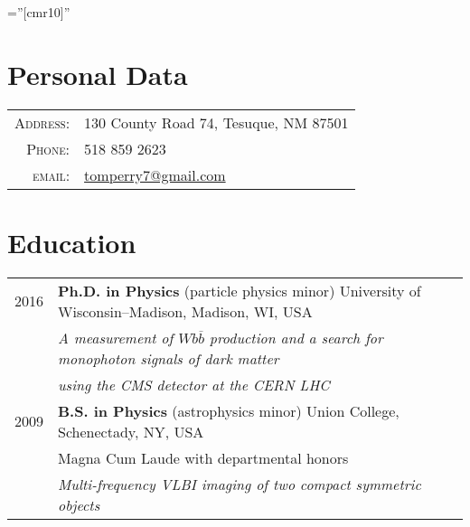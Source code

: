 \documentclass[10pt]{article} %
\begin{document}
\pagestyle{empty} %

\font\fb=''[cmr10]'' %


\par{\bigskip\par} %

\section{Personal Data}

\begin{tabular}{rl}
\textsc{Address:} & 130 County Road 74, Tesuque, NM 87501 \\
\textsc{Phone:} & 518 859 2623 \\
\textsc{email:} & \href{mailto:tomperry7@gmail.com}{tomperry7@gmail.com} \\
\end{tabular}


\section{Education}

\begin{tabular}{rl}	
2016 & {\bf Ph.D. in Physics} (particle physics minor) University of Wisconsin--Madison, Madison, WI, USA \\
 {}  & \emph{A measurement of $Wb\overline{b}$ production and a search for monophoton signals of dark matter}\\
 {}  & \emph{ using the CMS detector at the CERN LHC} \\

2009 & {\bf B.S. in Physics} (astrophysics minor) Union College, Schenectady, NY, USA \\
 {}  & Magna Cum Laude with departmental honors \\
 {}  & \emph{Multi-frequency VLBI imaging of two compact symmetric objects} \\
\end{tabular}
\end{document}
